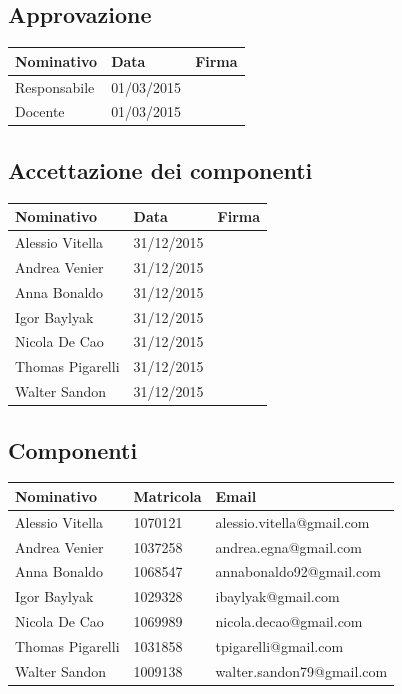 \documentclass[12pt,a4paper]{article}
\begin{document}
\subsection{Approvazione}

\begin{tabular}{| l | l | l |}
    \hline
    Nominativo & Data & Firma \\ \hline
    Responsabile & 01/03/2015 & \\ \hline
    Docente & 01/03/2015 & \\ \hline
\end{tabular}

\subsection{Accettazione dei componenti}

\begin{tabular}{| l | l | l |}
    \hline
    Nominativo & Data & Firma \\ \hline
    Alessio Vitella & 31/12/2015 & \\ \hline
    Andrea Venier & 31/12/2015 & \\ \hline
    Anna Bonaldo & 31/12/2015 & \\ \hline
    Igor Baylyak & 31/12/2015 & \\ \hline
    Nicola De Cao & 31/12/2015 & \\ \hline
    Thomas Pigarelli & 31/12/2015 & \\ \hline
    Walter Sandon & 31/12/2015 & \\ \hline
\end{tabular}

\subsection{Componenti}

\begin{tabular}{| l | l | l |}
    \hline
    Nominativo & Matricola & Email \\ \hline
    Alessio Vitella & 1070121 & alessio.vitella@gmail.com \\ \hline
    Andrea Venier & 1037258 & andrea.egna@gmail.com \\ \hline
    Anna Bonaldo & 1068547 & annabonaldo92@gmail.com \\ \hline
    Igor Baylyak & 1029328 & ibaylyak@gmail.com \\ \hline
    Nicola De Cao & 1069989 & nicola.decao@gmail.com \\ \hline
    Thomas Pigarelli & 1031858 & tpigarelli@gmail.com \\ \hline
    Walter Sandon & 1009138 & walter.sandon79@gmail.com \\ \hline
\end{tabular}
\end{document}
